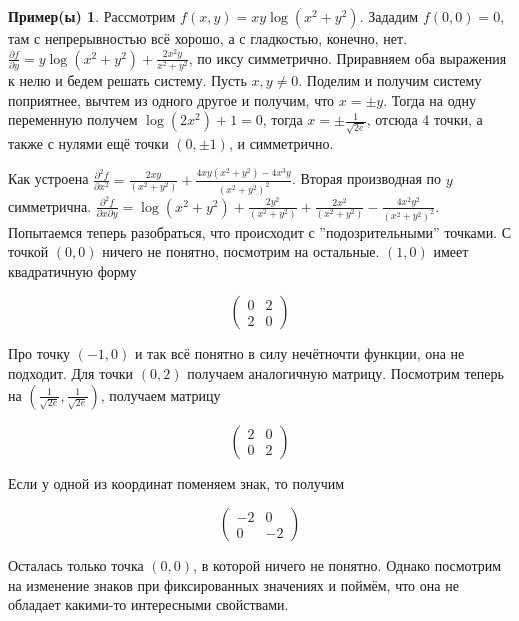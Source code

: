 \documentclass[a4paper,100pt]{article}
\theoremstyle{indented}
\theoremstyle{definition}
\newtheorem{exl}{Пример(ы)}
\theoremstyle{remark}
\begin{document}
\begin{exl}
    Рассмотрим $f(x, y)=xy\log(x^2+y^2)$. Зададим $f(0, 0)=0$, там с непрерывностью всё хорошо, а с гладкостью, конечно, нет. $\frac{\partial f}{\partial y}= y\log(x^2+y^2)+\frac{2x^2y}{x^2+y^2}$, по иксу симметрично. Приравняем оба выражения к нелю и бедем решать систему. Пусть $x, y\neq 0$. Поделим и получим систему поприятнее, вычтем из одного другое и получим, что $x=\pm y$. Тогда на одну переменную получем $\log(2x^2)+1=0$, тогда $x=\pm\frac{1}{\sqrt{2e}}$, отсюда 4 точки, а также с нулями ещё точки $(0, \pm 1)$, и симметрично. \ 

    Как устроена $\frac{\partial^2 f}{\partial x^2}=\frac{2xy}{(x^2+y^2)}+\frac{4xy(x^2+y^2)-4x^3y}{(x^2+y^2)^2}$. Вторая производная по $y$ симметрична. $\frac{\partial^2 f}{\partial x\partial y}=\log(x^2+y^2)+\frac{2y^2}{(x^2+y^2)}+\frac{2x^2}{(x^2+y^2)}- \frac{4x^2y^2}{(x^2+y^2)^2}$. Попытаемся теперь разобраться, что происходит с ''подозрительными'' точками. С точкой $(0, 0)$ ничего не понятно, посмотрим на остальные. $(1, 0)$ имеет квадратичную форму 
    
    \begin{equation*}
        \begin{pmatrix}
            0 & 2 \\
            2 & 0
        \end{pmatrix}
    \end{equation*}

    Про точку $(-1, 0)$ и так всё понятно в силу нечётночти функции, она не подходит. Для точки $(0, 2)$ получаем аналогичную матрицу. Посмотрим теперь на $(\frac{1}{\sqrt{2e}}, \frac{1}{\sqrt{2e}})$, получаем матрицу

    \begin{equation*}
        \begin{pmatrix}
            2 & 0 \\
            0 & 2
        \end{pmatrix}
    \end{equation*}

    Если у одной из координат поменяем знак, то получим

    \begin{equation*}
        \begin{pmatrix}
            -2 & 0 \\
            0 & -2
        \end{pmatrix}
    \end{equation*}

    Осталась только точка $(0, 0)$, в которой ничего не понятно. Однако посмотрим на изменение знаков при фиксированных значениях и поймём, что она не обладает какими-то интересными свойствами. 

\end{exl}
\end{document}
